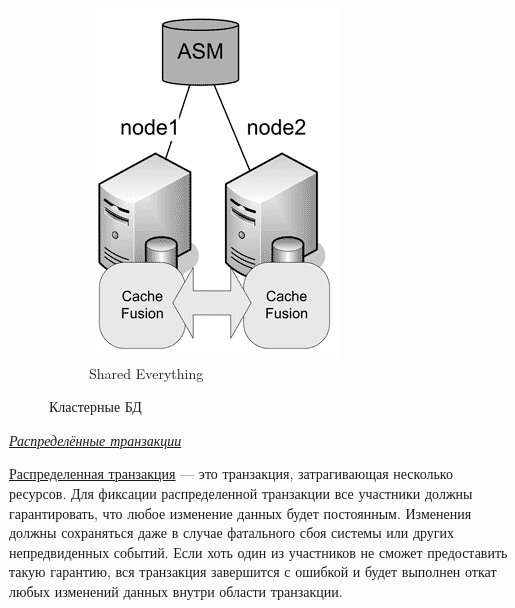 \begin{figure}[h]
\begin{subfigure}[b]{0.2\textwidth}
		\includegraphics[width=\textwidth]{7/07_04.png}
		\caption{Shared Everything}
		\label{fig:my_label}
	\end{subfigure}
	
	\caption{Кластерные БД}
	\label{fig:my_label4}
\end{figure}


\begin{center}
	\textit{\underline{Распределённые транзакции}}
\end{center}

\href{https://en.wikipedia.org/wiki/Distributed_transaction}{Распределенная транзакция} — это транзакция, затрагивающая несколько ресурсов. Для фиксации распределенной транзакции все участники должны гарантировать, что любое изменение данных будет постоянным. Изменения должны сохраняться даже в случае фатального сбоя системы или других непредвиденных событий. Если хоть один из участников не сможет предоставить такую гарантию, вся транзакция завершится с ошибкой и будет выполнен откат любых изменений данных внутри области транзакции.

